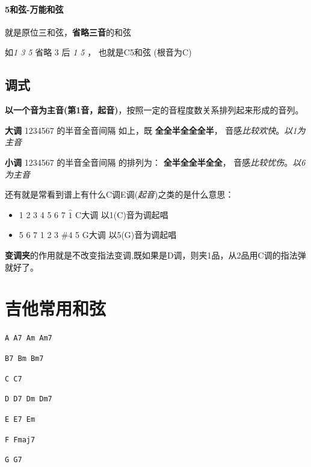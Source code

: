 \documentclass[UTF8,a4paper,12pt]{ctexbook}
\begin{document}
			
			\paragraph{5和弦-万能和弦}
				就是原位三和弦，\textbf{省略三音}的和弦
				
				如\textit{1 3 5} 省略 3 后 \textit{1 5} ， 也就是C5和弦 (根音为C)
			
			
		\subsection{调式}
			\textbf{以一个音为主音(第1音，起音)}，按照一定的音程度数关系排列起来形成的音列。	
	
			\textbf{大调} 1234567 的半音全音间隔 如上，既 \textbf{全全半全全全半}， 音感\textit{比较欢快}。\textit{以1为主音}
			
			\textbf{小调} 1234567 的半音全音间隔 的排列为：\textbf{ 全半全全半全全}， 音感\textit{比较忧伤}。\textit{以6为主音}
			
			还有就是常看到谱上有什么C调E调(\textit{起音})之类的是什么意思：
			
			\begin{itemize}[itemindent = 1em]
				\item 1 2 3 4 5 6 7 $\hat{1}$ C大调 以1(C)音为调起唱
				\item 5 6 7 1 2 3 \#4 5 G大调 以5(G)音为调起唱
			\end{itemize}
		
			\textbf{变调夹}的作用就是不改变指法变调,既如果是D调，则夹1品，从2品用C调的指法弹就好了。	
	
	\newpage
	\section{吉他常用和弦}
	
		 \verb|A A7 Am Am7|
		
		 \verb|B7 Bm Bm7| 
		 
		 \verb|C C7| 
		 
		 \verb|D D7 Dm Dm7 |
		 
		 \verb|E E7 Em| 
		 
		 \verb|F Fmaj7| 
		 
		 \verb|G G7 | 
	
\end{document}
